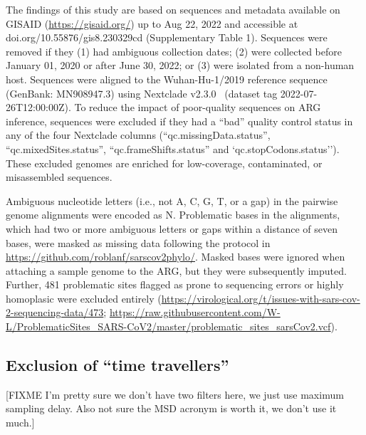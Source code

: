 \documentclass{article}
\begin{document}
The findings of this study are
based on sequences and metadata available on GISAID (\url{https://gisaid.org/})
up to Aug 22, 2022 and accessible at
doi.org/10.55876/gis8.230329cd (Supplementary Table 1). Sequences were removed
if they (1) had ambiguous collection dates; (2) were collected before January
01, 2020 or after June 30, 2022; or (3) were isolated from a non-human host.
Sequences were aligned to the Wuhan-Hu-1/2019 reference sequence (GenBank:
MN908947.3) using Nextclade v2.3.0~\citep{Aksamentov2021-hj} (dataset tag
2022-07-26T12:00:00Z). To reduce the impact of poor-quality sequences on ARG
inference, sequences were excluded if they had a ``bad'' quality control status
in any of the four Nextclade columns (``qc.missingData.status'',
``qc.mixedSites.status'', ``qc.frameShifts.status'' and
`qc.stopCodons.status''). These excluded genomes are enriched for low-coverage,
contaminated, or misassembled sequences.

Ambiguous nucleotide letters (i.e.,
not A, C, G, T, or a gap) in the pairwise genome alignments were encoded as N.
Problematic bases in the alignments, which had two or more ambiguous letters or
gaps within a distance of seven bases, were masked as missing data following
the protocol in \url{https://github.com/roblanf/sarscov2phylo/}. Masked bases
were ignored when attaching a sample genome to the ARG, but they were
subsequently imputed. Further, 481 problematic sites flagged as prone to
sequencing errors or highly homoplasic were excluded entirely
(\url{https://virological.org/t/issues-with-sars-cov-2-sequencing-data/473};
\url{https://raw.githubusercontent.com/W-L/ProblematicSites_SARS-CoV2/master/problematic_sites_sarsCov2.vcf}).

\subsection{Exclusion of ``time travellers''}
[FIXME I'm pretty sure we don't have two filters here, we just use
maximum sampling delay. Also not sure the MSD acronym is worth it,
we don't use it much.]
\end{document}
